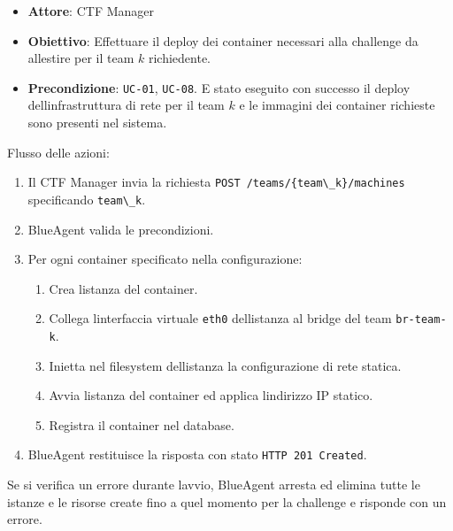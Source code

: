 \begin{itemize}
\tightlist
\item
  \textbf{Attore}: CTF Manager
\item
  \textbf{Obiettivo}: Effettuare il deploy dei container necessari alla
  challenge da allestire per il team \(k\) richiedente.
\item
  \textbf{Precondizione}: \passthrough{\lstinline!UC-01!},
  \passthrough{\lstinline!UC-08!}. E\textquotesingle{} stato eseguito
  con successo il deploy dell\textquotesingle infrastruttura di rete per
  il team \(k\) e le immagini dei container richieste sono presenti nel
  sistema.
\end{itemize}

Flusso delle azioni:

\begin{enumerate}
\def\labelenumi{\arabic{enumi}.}
\tightlist
\item
  Il CTF Manager invia la richiesta
  \passthrough{\lstinline!POST /teams/\{team\_k\}/machines!}
  specificando \passthrough{\lstinline!team\_k!}.
\item
  BlueAgent valida le precondizioni.
\item
  Per ogni container specificato nella configurazione:

  \begin{enumerate}
  \def\labelenumii{\arabic{enumii}.}
  \tightlist
  \item
    Crea l\textquotesingle istanza del container.
  \item
    Collega l\textquotesingle interfaccia virtuale
    \passthrough{\lstinline!eth0!} dell\textquotesingle istanza al
    bridge del team \passthrough{\lstinline!br-team-k!}.
  \item
    Inietta nel filesystem dell\textquotesingle istanza la
    configurazione di rete statica.
  \item
    Avvia l\textquotesingle istanza del container ed applica
    l\textquotesingle indirizzo IP statico.
  \item
    Registra il container nel database.
  \end{enumerate}
\item
  BlueAgent restituisce la risposta con stato
  \passthrough{\lstinline!HTTP 201 Created!}.
\end{enumerate}

Se si verifica un errore durante l\textquotesingle avvio, BlueAgent
arresta ed elimina tutte le istanze e le risorse create fino a quel
momento per la challenge e risponde con un errore.

